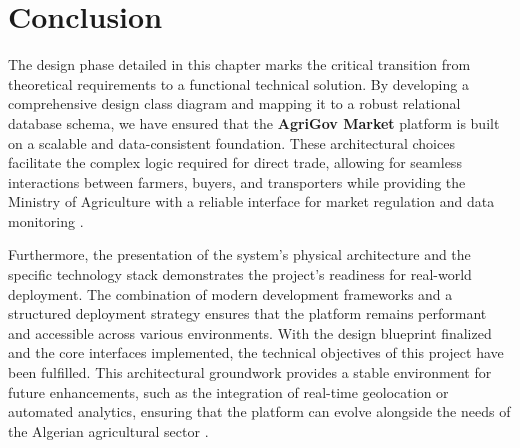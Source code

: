 \newpage

\section{Conclusion}

The design phase detailed in this chapter marks the critical transition from theoretical requirements to a functional technical solution. By developing a comprehensive design class diagram and mapping it to a robust relational database schema, we have ensured that the \textbf{AgriGov Market} platform is built on a scalable and data-consistent foundation. These architectural choices facilitate the complex logic required for direct trade, allowing for seamless interactions between farmers, buyers, and transporters while providing the Ministry of Agriculture with a reliable interface for market regulation and data monitoring \cite{Kaur2023}.

Furthermore, the presentation of the system's physical architecture and the specific technology stack demonstrates the project's readiness for real-world deployment. The combination of modern development frameworks and a structured deployment strategy ensures that the platform remains performant and accessible across various environments. With the design blueprint finalized and the core interfaces implemented, the technical objectives of this project have been fulfilled. This architectural groundwork provides a stable environment for future enhancements, such as the integration of real-time geolocation or automated analytics, ensuring that the platform can evolve alongside the needs of the Algerian agricultural sector \cite{Belhadi2024}.